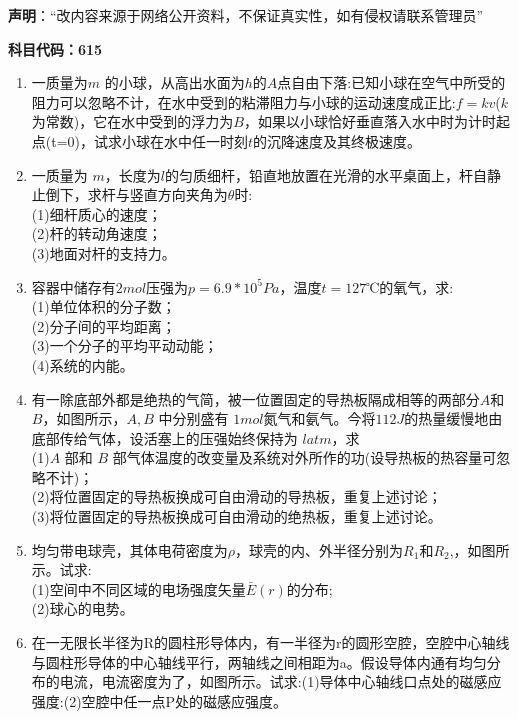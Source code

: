 

\textbf{声明}：“改内容来源于网络公开资料，不保证真实性，如有侵权请联系管理员”


\textbf{科目代码：615}

\begin{enumerate}
\item 一质量为$ m$ 的小球，从高出水面为$h$的$ A $点自由下落:已知小球在空气中所受的阻力可以忽略不计，在水中受到的粘滞阻力与小球的运动速度成正比:$f=kv$($k$为常数)，它在水中受到的浮力为$ B$，如果以小球恰好垂直落入水中时为计时起点(t=0)，试求小球在水中任一时刻$t$的沉降速度及其终极速度。
\item 一质量为 $m$，长度为$l$的匀质细杆，铅直地放置在光滑的水平桌面上，杆自静止倒下，求杆与竖直方向夹角为$\theta$时:\\
(1)细杆质心的速度；\\
(2)杆的转动角速度；\\
(3)地面对杆的支持力。
\item 容器中储存有$2mol $压强为$ p=6.9*10^5Pa$，温度$t=127$℃的氧气，求:\\
(1)单位体积的分子数；\\
(2)分子间的平均距离；\\
(3)一个分子的平均平动动能；\\
(4)系统的内能。
\item 有一除底部外都是绝热的气简，被一位置固定的导热板隔成相等的两部分$A$和 $B$，如图所示，$A,B$ 中分别盛有 $1mol$氮气和氨气。今将$112J$的热量缓慢地由底部传给气体，设活塞上的压强始终保持为 $latm$，求\\
(1)$A$ 部和 $B$ 部气体温度的改变量及系统对外所作的功(设导热板的热容量可忽略不计)；\\
(2)将位置固定的导热板换成可自由滑动的导热板，重复上述讨论；\\
(3)将位置固定的导热板换成可自由滑动的绝热板，重复上述讨论。
\item 均匀带电球壳，其体电荷密度为$\rho$，球壳的内、外半径分别为$R_1$和$R_2$,，如图所示。试求:\\
(1)空间中不同区域的电场强度矢量$\bar E(r)$的分布;\\
(2)球心的电势。
\item 在一无限长半径为R的圆柱形导体内，有一半径为r的圆形空腔，空腔中心轴线与圆柱形导体的中心轴线平行，两轴线之间相距为a。假设导体内通有均匀分布的电流，电流密度为了，如图所示。试求:(1)导体中心轴线口点处的磁感应强度:(2)空腔中任一点P处的磁感应强度。
\end{enumerate}
